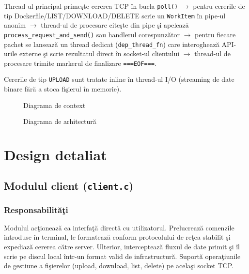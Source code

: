 \documentclass[12pt, a4paper]{article}
\begin{document}
Thread-ul principal prime\c{s}te cererea TCP \^{i}n bucla \texttt{poll()} $\rightarrow$ pentru
cererile de tip Dockerfile/LIST/DOWNLOAD/DELETE scrie un \texttt{WorkItem} \^{i}n pipe-ul anonim
$\rightarrow$ thread-ul de procesare cite\c{s}te din pipe \c{s}i apeleaz\u{a}
\texttt{process\_request\_and\_send()} sau handlerul corespunz\u{a}tor $\rightarrow$ pentru fiecare
pachet se lanseaz\u{a} un thread dedicat (\texttt{dep\_thread\_fn}) care interogheaz\u{a} API-urile
externe \c{s}i scrie rezultatul direct \^{i}n socket-ul clientului $\rightarrow$ thread-ul de
procesare trimite markerul de finalizare \texttt{===EOF===}.

Cererile de tip \texttt{UPLOAD} sunt tratate inline \^{i}n thread-ul I/O (streaming de date binare
f\u{a}r\u{a} a stoca fi\c{s}ierul \^{i}n memorie).

\begin{figure}[h]
    \centering
    \caption{Diagrama de context}
    \label{fig:context}
\end{figure}

\begin{figure}[h]
    \centering
    \caption{Diagrama de arhitectur\u{a}}
    \label{fig:arch}
\end{figure}

\section{Design detaliat}

\subsection{Modulul client (\texttt{client.c})}

\subsubsection{Responsabilit\u{a}\c{t}i}

Modulul ac\c{t}ioneaz\u{a} ca interfa\c{t}\u{a} direct\u{a} cu utilizatorul. Prelucreaz\u{a} comenzile
introduse \^{i}n terminal, le formateaz\u{a} conform protocolului de re\c{t}ea stabilit \c{s}i expediaz\u{a}
cererea c\u{a}tre server. Ulterior, intercepteaz\u{a} fluxul de date primit \c{s}i \^{i}l scrie pe discul
local \^{i}ntr-un format valid de infrastructur\u{a}. Suport\u{a} opera\c{t}iunile de gestiune a
fi\c{s}ierelor (upload, download, list, delete) pe acela\c{s}i socket TCP.
\end{document}
